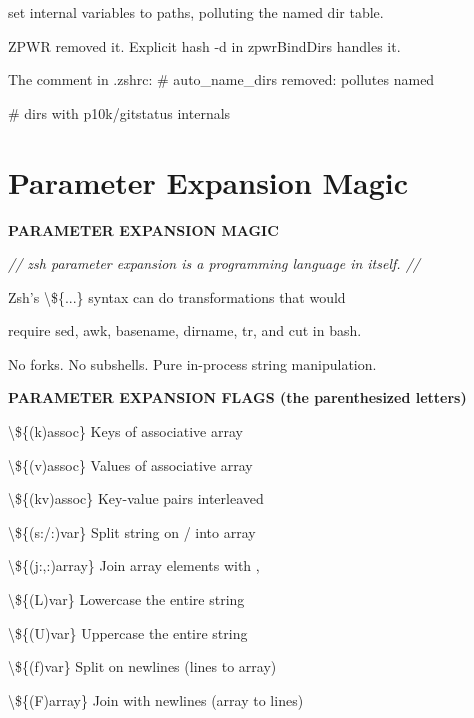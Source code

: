 \documentclass[11pt,a4paper,twoside]{book}
\begin{document}
set internal variables to paths, polluting the named dir table.

ZPWR removed it. Explicit hash -d in zpwrBindDirs handles it.

The comment in .zshrc: \# auto\_name\_dirs removed: pollutes named

\# dirs with p10k/gitstatus internals


\vspace{16pt}

\section{Parameter Expansion Magic}


\vspace{10pt}
{\large\bfseries\color{neoncyan} PARAMETER EXPANSION MAGIC}\vspace{6pt}

{\small\itshape\color{dimtext} // zsh parameter expansion is a programming language in itself. //}

Zsh's \textbackslash{}\$\{...\} syntax can do transformations that would

require sed, awk, basename, dirname, tr, and cut in bash.

No forks. No subshells. Pure in-process string manipulation.


\vspace{12pt}
{\bfseries\color{neonyellow} PARAMETER EXPANSION FLAGS (the parenthesized letters)}\vspace{4pt}

\textbackslash{}\$\{(k)assoc\}          Keys of associative array

\textbackslash{}\$\{(v)assoc\}          Values of associative array

\textbackslash{}\$\{(kv)assoc\}         Key-value pairs interleaved

\textbackslash{}\$\{(s:/:)var\}         Split string on / into array

\textbackslash{}\$\{(j:,:)array\}       Join array elements with ,

\textbackslash{}\$\{(L)var\}            Lowercase the entire string

\textbackslash{}\$\{(U)var\}            Uppercase the entire string

\textbackslash{}\$\{(f)var\}            Split on newlines (lines to array)

\textbackslash{}\$\{(F)array\}          Join with newlines (array to lines)
\end{document}
